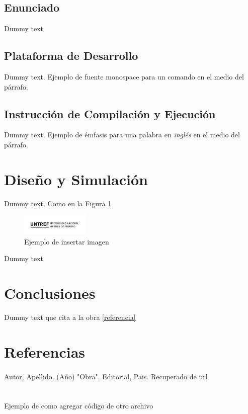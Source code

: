 \documentclass{article}
\begin{document}
\subsection{Enunciado}
Dummy text

\subsection{Plataforma de Desarrollo}
Dummy text. Ejemplo de fuente monospace {\ttfamily para un comando} en el medio del párrafo.

\subsection{Instrucción de Compilación y Ejecución}
Dummy text. Ejemplo de émfasis para una palabra en \textit{inglés} en el medio del párrafo.

\section{Diseño y Simulación}
Dummy text. Como en la Figura \ref{ejemplo-imagen}
\begin{figure}[h]
    \centering
    \includegraphics[height=1cm]{logo.png}
    \caption{Ejemplo de insertar imagen}
    \label{ejemplo-imagen}
\end{figure}
\clearpage 
Dummy text

\section{Conclusiones}
Dummy text que cita a la obra \ref{referencia}

\section{Referencias}
\setcounter{secnumdepth}{4}
\renewcommand{\theparagraph}{[\arabic{paragraph}]}
\paragraph{} Autor, Apellido. (Año) "Obra". Editorial, Pais. Recuperado de url\label{referencia}

\appendix
\renewcommand\thesection{Apéndice \Alph{section}}

\section{}
Ejemplo de como agregar código de otro archivo


\section{}
\end{document}
